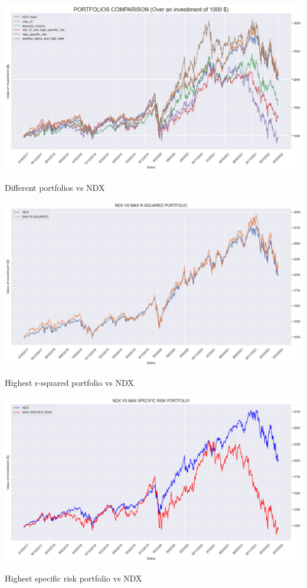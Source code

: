 \documentclass[twocolumn]{article}
\begin{document}
\begin{center}
\vspace{0.5 cm}\hspace*{-7.8cm}\includegraphics[scale=0.4]{portfoliosComparison.png} 
\caption{Different portfolios vs NDX}
\end{center}
\begin{center}
\centering\includegraphics[scale=0.4]{ndxMarR2.png}
\caption{Highest r-squared portfolio vs NDX}
\end{center}
\begin{center}
\centering\includegraphics[scale=0.4]{ndxMasSpecificRisk.png}
\caption{Highest specific risk portfolio vs NDX}
\end{center}
\clearpage
\end{document}
